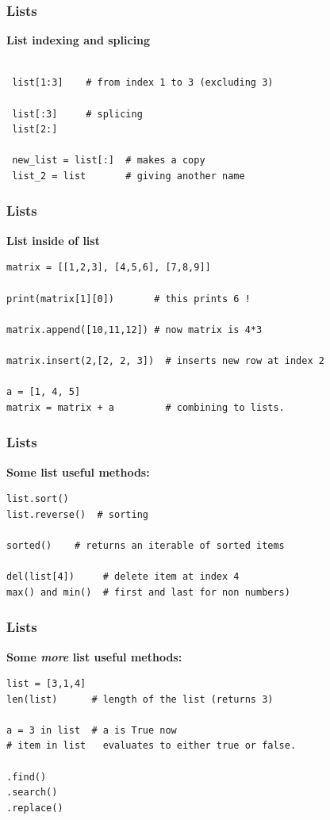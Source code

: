 \documentclass[12pt, aspectratio=169]{beamer}
\begin{document}
\begin{frame}[fragile]
  \frametitle{Lists}
\textbf{List indexing and splicing}
\vspace{2em}
\begin{verbatim}

 list[1:3]    # from index 1 to 3 (excluding 3)

 list[:3]     # splicing
 list[2:]

 new_list = list[:]  # makes a copy
 list_2 = list       # giving another name

\end{verbatim}
\end{frame}

\begin{frame}[fragile]
  \frametitle{Lists}
\textbf{List inside of list}
\begin{verbatim}
matrix = [[1,2,3], [4,5,6], [7,8,9]]

print(matrix[1][0])       # this prints 6 !

matrix.append([10,11,12]) # now matrix is 4*3

matrix.insert(2,[2, 2, 3])  # inserts new row at index 2

a = [1, 4, 5]  
matrix = matrix + a         # combining to lists.
\end{verbatim}
\end{frame}

\begin{frame}[fragile]
  \frametitle{Lists}
\textbf{Some list useful methods: }
\begin{verbatim}
list.sort()
list.reverse()  # sorting

sorted()    # returns an iterable of sorted items

del(list[4])     # delete item at index 4
max() and min()  # first and last for non numbers)
\end{verbatim}
\end{frame}

\begin{frame}[fragile]
  \frametitle{Lists}
\textbf{Some \textit{more} list useful methods: }
\vspace{1em}
\begin{verbatim}
list = [3,1,4] 
len(list)      # length of the list (returns 3)

a = 3 in list  # a is True now
# item in list   evaluates to either true or false.

.find()
.search()
.replace()

\end{verbatim}
\end{frame}
\end{document}
